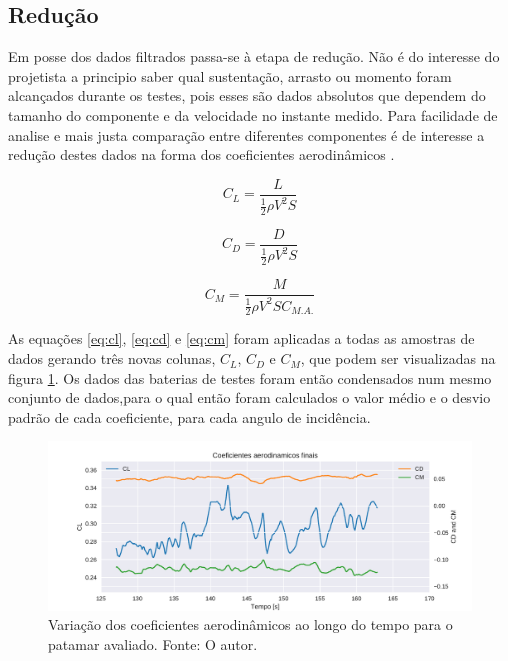 \subsection{Redução}

Em posse dos dados filtrados passa-se à etapa de redução. Não é do interesse do projetista a principio saber qual sustentação, arrasto ou momento foram alcançados durante os testes, pois esses são dados absolutos que dependem do tamanho do componente e da velocidade no instante medido. Para facilidade de analise e mais justa comparação entre diferentes componentes é de interesse a redução destes dados na forma dos coeficientes aerodinâmicos \citep{anderson1984fundamentals}.

\begin{equation}
    C_L =  \frac{L}{ \frac{1}{2} \rho V^{2} S}
    \label{eq:cl}
\end{equation}

\begin{equation} 
    C_D =  \frac{D}{ \frac{1}{2} \rho V^{2} S}
    \label{eq:cd}
\end{equation}

\begin{equation}
    C_M =  \frac{M}{ \frac{1}{2} \rho V^{2} S C_{M.A.}} 
    \label{eq:cm}
\end{equation}

As equações \ref{eq:cl}, \ref{eq:cd} e \ref{eq:cm} foram aplicadas a todas as amostras de dados gerando três novas colunas, $C_L$, $C_D$ e $C_M$, que podem ser visualizadas na figura \ref{fig:coefficients_plot}. Os dados das baterias de testes foram então condensados num mesmo conjunto de dados,para o qual então foram calculados o valor médio e o desvio padrão de cada coeficiente, para cada angulo de incidência.

\begin{figure}[!ht]
    \centering
    \includegraphics[width=.8\linewidth]{plots/coefficients_plot.pdf}
    \caption{Variação dos coeficientes aerodinâmicos ao longo do tempo para o patamar avaliado. Fonte: O autor.}
    \label{fig:coefficients_plot}
\end{figure}

